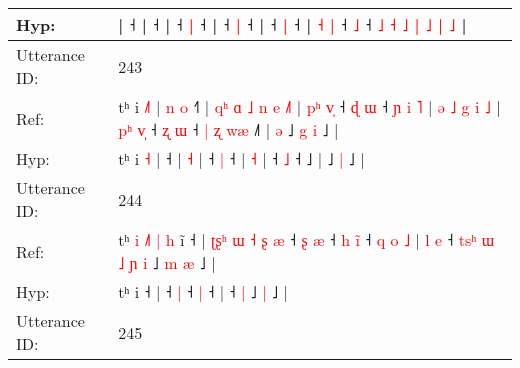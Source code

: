\documentclass[10pt]{article}
\DeclareRobustCommand{\hl}[1]{{\textcolor{red}{#1}}}
\begin{document}
\begin{longtable}{ll}
 \\
Hyp: & \hl{}\hl{}\hl{}\hl{}\hl{}\hl{}\hl{}\hl{}\hl{}\hl{}\hl{}\hl{}\hl{}\hl{}|\hl{}\hl{}\hl{}\hl{} ˧\hl{}\hl{}\hl{}\hl{}\hl{}\hl{}\hl{}\hl{} |\hl{}\hl{}\hl{}\hl{}\hl{}\hl{}\hl{}\hl{}\hl{} ˧ |\hl{}\hl{}\hl{}\hl{} ˧\hl{}\hl{}\hl{} \hl{|} ˧\hl{}\hl{}\hl{}\hl{}\hl{}\hl{}\hl{}\hl{}\hl{}\hl{}\hl{}\hl{} |\hl{}\hl{} ˧\hl{}\hl{} \hl{|} ˧\hl{}\hl{}\hl{}\hl{}\hl{}\hl{}\hl{}\hl{}\hl{}\hl{}\hl{}\hl{} |\hl{}\hl{}\hl{}\hl{}\hl{}\hl{}\hl{}\hl{}\hl{}\hl{}\hl{} ˧\hl{}\hl{} \hl{|} ˧\hl{} | \hl{˧} \hl{|} ˧\hl{}\hl{}\hl{} \hl{}\hl{˩} ˧ \hl{˩} \hl{˧} \hl{˩} \hl{|} \hl{˩} \hl{|} \hl{˩} |
 \\
\midrule
Utterance ID: & 243 \\
Ref: & tʰ i \hl{˩}\hl{˥} |\hl{ }\hl{n}\hl{ }\hl{o} ˧\hl{˥} |\hl{ }\hl{q}\hl{ʰ}\hl{ }\hl{ɑ}\hl{ }\hl{˩}\hl{ }\hl{n}\hl{ }\hl{e} \hl{˩}\hl{˥} |\hl{ }\hl{p}\hl{ʰ}\hl{ }\hl{v}\hl{̩} ˧\hl{ }\hl{ɖ} \hl{ɯ} ˧\hl{ }\hl{ɲ}\hl{ }\hl{i}\hl{ }\hl{˥} |\hl{ }\hl{ə}\hl{ }\hl{˩}\hl{ }\hl{g}\hl{ }\hl{i} \hl{˩} |\hl{ }\hl{p}\hl{ʰ}\hl{ }\hl{v}\hl{̩} ˧\hl{ }\hl{ʐ} \hl{ɯ} ˧\hl{ }\hl{|}\hl{ }\hl{ʐ}\hl{ }\hl{w}\hl{æ} ˩\hl{˥} |\hl{ }\hl{ə} ˩\hl{ }\hl{g} \hl{i} ˩ |
 \\
Hyp: & tʰ i \hl{}\hl{˧} |\hl{}\hl{}\hl{}\hl{} ˧\hl{} |\hl{}\hl{}\hl{}\hl{}\hl{}\hl{}\hl{}\hl{}\hl{}\hl{}\hl{} \hl{}\hl{˧} |\hl{}\hl{}\hl{}\hl{}\hl{}\hl{} ˧\hl{}\hl{} \hl{|} ˧\hl{}\hl{}\hl{}\hl{}\hl{}\hl{} |\hl{}\hl{}\hl{}\hl{}\hl{}\hl{}\hl{}\hl{} \hl{˧} |\hl{}\hl{}\hl{}\hl{}\hl{}\hl{} ˧\hl{}\hl{} \hl{˩} ˧\hl{}\hl{}\hl{}\hl{}\hl{}\hl{}\hl{} ˩\hl{} |\hl{}\hl{} ˩\hl{}\hl{} \hl{|} ˩ |
 \\
\midrule
Utterance ID: & 244 \\
Ref: & tʰ\hl{ }\hl{i}\hl{ }\hl{˩}\hl{˥}\hl{ }\hl{|}\hl{ }\hl{h} i\hl{̃} ˧ |\hl{ }\hl{ʈ}\hl{ʂ}\hl{ʰ}\hl{ }\hl{ɯ}\hl{ }\hl{˧}\hl{ }\hl{ʂ}\hl{ }\hl{æ} ˧\hl{ }\hl{ʂ} \hl{æ} ˧\hl{ }\hl{h} \hl{i}\hl{̃} ˧\hl{ }\hl{q}\hl{ }\hl{o}\hl{ }\hl{˩} |\hl{ }\hl{l}\hl{ }\hl{e} ˧\hl{ }\hl{t}\hl{s}\hl{ʰ}\hl{ }\hl{ɯ}\hl{ }\hl{˩}\hl{ }\hl{ɲ} \hl{i} ˩\hl{ }\hl{m} \hl{æ} ˩ |
 \\
Hyp: & tʰ\hl{}\hl{}\hl{}\hl{}\hl{}\hl{}\hl{}\hl{}\hl{} i\hl{} ˧ |\hl{}\hl{}\hl{}\hl{}\hl{}\hl{}\hl{}\hl{}\hl{}\hl{}\hl{}\hl{} ˧\hl{}\hl{} \hl{|} ˧\hl{}\hl{} \hl{}\hl{|} ˧\hl{}\hl{}\hl{}\hl{}\hl{}\hl{} |\hl{}\hl{}\hl{}\hl{} ˧\hl{}\hl{}\hl{}\hl{}\hl{}\hl{}\hl{}\hl{}\hl{}\hl{} \hl{|} ˩\hl{}\hl{} \hl{|} ˩ |
 \\
\midrule
Utterance ID: & 245 \\

\end{longtable}
\end{document}
